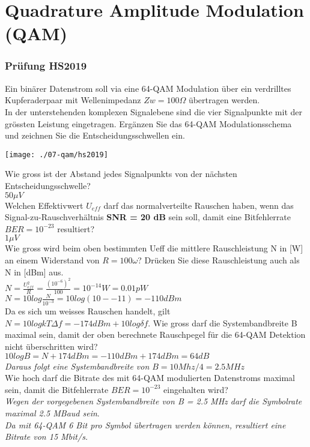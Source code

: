 

\section{Quadrature Amplitude Modulation (QAM)}

\subsubsection{Prüfung HS2019}
Ein binärer Datenstrom soll via eine 64-QAM Modulation über ein verdrilltes Kupferaderpaar mit Wellenimpedanz $Zw = 100 \Omega $  übertragen werden.\\
In der unterstehenden komplexen Signalebene sind die vier Signalpunkte mit der grössten Leistung eingetragen. Ergänzen Sie das 64-QAM Modulationsschema und zeichnen Sie
die Entscheidungsschwellen ein.\\
\begin{center}
    \vspace{-8pt}
    \texttt{[image: ./07-qam/hs2019]}
    \vspace{-8pt}
\end{center}

Wie gross ist der Abstand jedes Signalpunkts von der nächsten Entscheidungsschwelle?\\
$50\mu V$\\

Welchen Effektivwert $U_{eff}$ darf das normalverteilte Rauschen haben, wenn das Signal-zu-Rauschverhältnis \textbf{SNR = 20 dB} sein soll, damit eine Bitfehlerrate \textbf{$BER = 10^{-23}$} resultiert?\\
$1\mu V$\\

Wie gross wird beim oben bestimmten Ueff die mittlere Rauschleistung N in [W] an einem Widerstand von $R = 100 \omega$? Drücken Sie diese Rauschleistung auch als N in [dBm] aus.\\
$N=\frac{U_{eff}^2}{R}=\frac{(10^{-6})^2}{100}=10^{-14}W=0.01pW$\\
$N=10log\frac{N}{10^{-3}}=10log(10-{-11})=-110dBm$\\

Da es sich um weisses Rauschen handelt, gilt $N=10logkT\Delta f=-174dBm+10log\delta f$.
Wie gross darf die Systembandbreite B maximal sein, damit der oben berechnete Rauschpegel für die 64-QAM Detektion nicht überschritten wird?\\
$10logB=N+174dBm=-110dBm+174dBm=64dB$\\
\textit{Daraus folgt eine Systembandbreite von $B=10Mhz/4=2.5MHz$}\\

Wie hoch darf die Bitrate des mit 64-QAM modulierten Datenstroms maximal sein, damit die Bitfehlerrate \textbf{$BER = 10^{-23}$} eingehalten wird?\\
\textit{Wegen der vorgegebenen Systembandbreite von B = 2.5 MHz darf die Symbolrate maximal 2.5 MBaud sein}.\\
\textit{Da mit 64-QAM 6 Bit pro Symbol übertragen werden können, resultiert eine Bitrate von 15 Mbit/s.}

